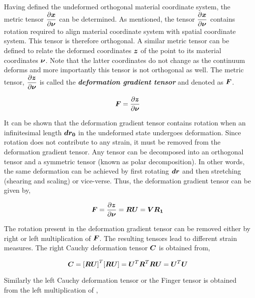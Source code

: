 Having defined the undeformed orthogonal material coordinate system, the
metric tensor $\delby{\vect{x}}{\vect{\nu}}$ can be determined. As mentioned,
the tensor $\delby{\vect{x}}{\vect{\nu}}$ contains rotation required to align
material coordinate system with spatial coordinate system. This tensor is
therefore orthogonal. A similar metric tensor can be defined to relate the
deformed coordinates $\vect{z}$ of the point to its material coordinates
$\vect{\nu}$. Note that the latter coordinates do not change as the continuum
deforms and more importantly this tensor is not orthogonal as well. The metric
tensor, $\delby{\vect{z}}{\vect{\nu}}$ is called the
\textit{\textbf{deformation gradient tensor}} and denoted as $\matr{F}$.

\begin{equation}
  \matr{F}=\delby{\vect{z}}{\vect{\nu}}
  \label{eqn:deformationgradienttensor}
\end{equation}
 
It can be shown that the deformation gradient tensor contains rotation when an
infinitesimal length $\vect{dr_{0}}$ in the undeformed state undergoes
deformation. Since rotation does not contribute to any strain, it must be
removed from the deformation gradient tensor. Any tensor can be decomposed
into an orthogonal tensor and a symmetric tensor (known as polar
decomposition). In other words, the same deformation can be achieved by first
rotating $\vect{dr}$ and then stretching (shearing and scaling) or
vice-verse. Thus, the deformation gradient tensor can be given by,

\begin{equation}
  \matr{F}=\delby{\vect{z}}{\vect{\nu}}=\matr{R}\matr{U}=\matr{V}\matr{R_{1}}
  \label{eqn:polardecomposition}
\end{equation}
 
The rotation present in the deformation gradient tensor can be removed either
by right or left multiplication of $\matr{F}$. The resulting tensors lead to
different strain measures. The right Cauchy deformation tensor $\matr{C}$ is
obtained from,

\begin{equation}
  \matr{C}=\transpose{[\matr{R}\matr{U}]}[\matr{R}\matr{U}]=\transpose{\matr{U}}\transpose{\matr{R}}\matr{R}\matr{U}=\transpose{\matr{U}}\matr{U}
  \label{eqn:rightCauchy}
\end{equation}

Similarly the left Cauchy deformation tensor or the Finger tensor  is
obtained from the left multiplication of ,

